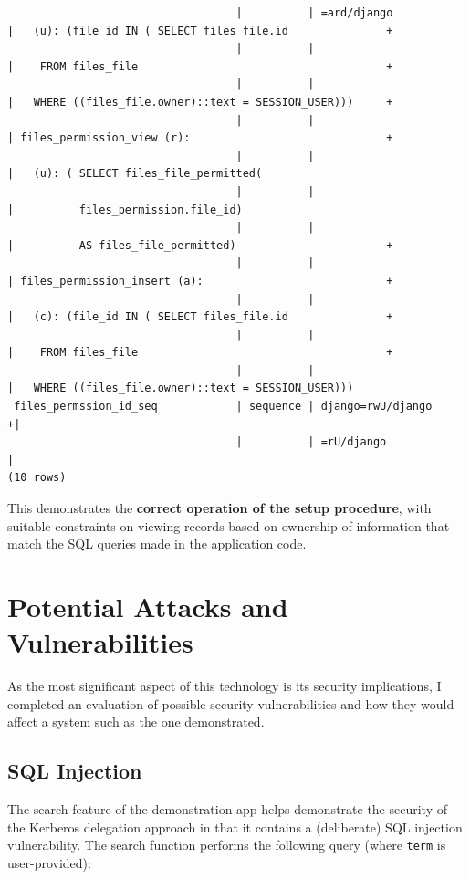 \documentclass[12pt]{report}
\begin{document}
\begin{landscape}
{\begin{verbatim}
                                   |          | =ard/django           |   (u): (file_id IN ( SELECT files_file.id               +
                                   |          |                       |    FROM files_file                                      +
                                   |          |                       |   WHERE ((files_file.owner)::text = SESSION_USER)))     +
                                   |          |                       | files_permission_view (r):                              +
                                   |          |                       |   (u): ( SELECT files_file_permitted(
                                   |          |                       |          files_permission.file_id)
                                   |          |                       |          AS files_file_permitted)                       +
                                   |          |                       | files_permission_insert (a):                            +
                                   |          |                       |   (c): (file_id IN ( SELECT files_file.id               +
                                   |          |                       |    FROM files_file                                      +
                                   |          |                       |   WHERE ((files_file.owner)::text = SESSION_USER)))
 files_permssion_id_seq            | sequence | django=rwU/django    +|
                                   |          | =rU/django            |
(10 rows)
\end{verbatim}
  }

  This demonstrates the \textbf{correct operation of the setup procedure}, with suitable constraints on viewing records based on ownership of information that match the SQL queries made in the application code.

\end{landscape}

\section{Potential Attacks and Vulnerabilities}
\label{sec:potential_attacks}
As the most significant aspect of this technology is its security implications, I completed an evaluation of possible security vulnerabilities and how they would affect a system such as the one demonstrated.

\subsection{SQL Injection}
The search feature of the demonstration app helps demonstrate the security of the Kerberos delegation approach in that it contains a (deliberate) SQL injection vulnerability. The search function performs the following query (where \texttt{term} is user-provided):
\end{document}
